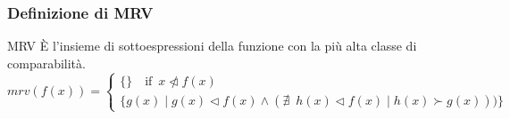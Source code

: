 \documentclass[aspectratio=149]{beamer}
\begin{document}
	\begin{frame}
		\frametitle{Definizione di MRV}
		\begin{block}{MRV}
			È l'insieme di sottoespressioni della funzione con la più alta classe di comparabilità.
			\[
			mrv(f(x)) = \begin{cases}
				\{\} \quad \text{if} \enspace x \ntriangleleft f(x) \\
				\{g(x) \mid g(x) \triangleleft f(x) \wedge (\nexists \enspace h(x) \triangleleft f(x) \mid h(x) \succ g(x)))\}
			\end{cases}
			\]
		\end{block}
	\end{frame}
	
\end{document}
